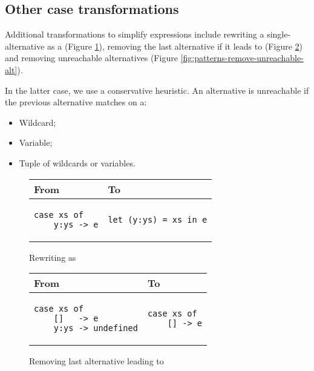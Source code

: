 \subsection{Other case transformations}

Additional transformations to simplify  expressions include rewriting a single-alternative  as a  (Figure \ref{fig:patterns-rewrite-case-let}), removing the last alternative if it leads to  (Figure \ref{fig:patterns-remove-undefined-alt}) and removing unreachable alternatives (Figure \ref{fig:patterns-remove-unreachable-alt}).

In the latter case, we use a conservative heuristic. An alternative is unreachable if the previous alternative matches on a:

\begin{itemize}
\item Wildcard;
\item Variable;
\item Tuple of wildcards or variables.
\end{itemize}

\begin{figure}
\centering
\begin{tabular}{>{\centering\arraybackslash}m{10em} | >{\centering\arraybackslash}m{10em} }
From & To \\
\hline
\begin{verbatim}
case xs of
    y:ys -> e
\end{verbatim}
& \begin{verbatim}
let (y:ys) = xs in e
\end{verbatim}
\end{tabular}
\caption{Rewriting  as }
\label{fig:patterns-rewrite-case-let}
\end{figure}

\begin{figure}
\centering
\begin{tabular}{>{\centering\arraybackslash}m{12em} | >{\centering\arraybackslash}m{8em} }
From & To \\
\hline
\begin{verbatim}
case xs of
    []   -> e
    y:ys -> undefined
\end{verbatim}
& \begin{verbatim}
case xs of
    [] -> e
\end{verbatim}
\end{tabular}
\caption{Removing last alternative leading to }
\label{fig:patterns-remove-undefined-alt}
\end{figure}

